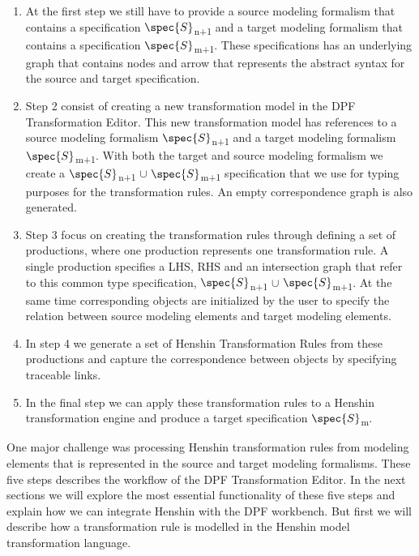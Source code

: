 \begin{enumerate}

\item At the first step we still have to provide a source modeling formalism
that contains a specification $\spec{S}$\textsubscript{n+1} and a target
modeling formalism that contains a specification $\spec{S}$\textsubscript{m+1}.
These specifications has an underlying graph that contains nodes and arrow that
represents the abstract syntax for the source and target specification. 

\item Step 2 consist of creating a new transformation model in the DPF
Transformation Editor. This new transformation model has references to a source
modeling formalism $\spec{S}$\textsubscript{n+1} and a target modeling formalism
$\spec{S}$\textsubscript{m+1}. With both the target and source modeling
formalism we create a $\spec{S}$\textsubscript{n+1} $\cup$
$\spec{S}$\textsubscript{m+1} specification that we use for typing
purposes for the transformation rules. An empty correspondence graph is also
generated.

\item Step 3 focus on creating the transformation rules through defining a set
of productions, where one production represents one transformation rule. A
single production specifies a LHS, RHS and an intersection graph that refer to
this common type specification,  $\spec{S}$\textsubscript{n+1} $\cup$
$\spec{S}$\textsubscript{m+1}. At the same time corresponding objects are
initialized by the user to specify the relation between source modeling elements
and target modeling elements. 

\item In step 4 we generate a set of Henshin Transformation Rules from these
productions and capture the correspondence between objects by specifying
traceable links.

\item In the final step we can apply these transformation rules to a Henshin
transformation engine and produce a target specification
$\spec{S}$\textsubscript{m}.

\end{enumerate}

One major challenge was processing Henshin transformation rules from modeling
elements that is represented in the source and target modeling formalisms.
These five steps describes the workflow of the DPF Transformation Editor. In
the next sections we will explore the most essential functionality of these
five steps and explain how we can integrate Henshin with the DPF workbench. But
first we will describe how a transformation rule is modelled in the Henshin
model transformation language.



